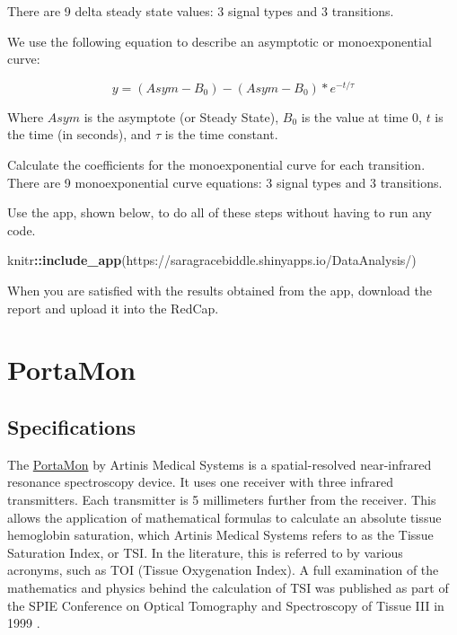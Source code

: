\documentclass[
]{book}
\newenvironment{Shaded}{\begin{snugshade}}{\end{snugshade}}
\newcommand{\FunctionTok}[1]{\textcolor[rgb]{0.13,0.29,0.53}{\textbf{#1}}}
\newcommand{\NormalTok}[1]{#1}
\newcommand{\SpecialCharTok}[1]{\textcolor[rgb]{0.81,0.36,0.00}{\textbf{#1}}}
\newcommand{\StringTok}[1]{\textcolor[rgb]{0.31,0.60,0.02}{#1}}
\begin{document}
There are 9 delta steady state values: 3 signal types and 3 transitions.

We use the following equation to describe an asymptotic or monoexponential curve:

\[y =({Asym}-B_0) - ({Asym}-B_0)*e^{-t/ \tau} \]

Where \({Asym}\) is the asymptote (or Steady State), \(B_0\) is the value at time 0, \(t\) is the time (in seconds), and \(\tau\) is the time constant.

Calculate the coefficients for the monoexponential curve for each transition. There are 9 monoexponential curve equations: 3 signal types and 3 transitions.

Use the app, shown below, to do all of these steps without having to run any code.

\begin{Shaded}
\begin{Highlighting}[]
\NormalTok{knitr}\SpecialCharTok{::}\FunctionTok{include\_app}\NormalTok{(}\StringTok{\textquotesingle{}https://saragracebiddle.shinyapps.io/DataAnalysis/\textquotesingle{}}\NormalTok{)}
\end{Highlighting}
\end{Shaded}

When you are satisfied with the results obtained from the app, download the report and upload it into the RedCap.

\hypertarget{appendix-appendix}{%
\appendix}


\hypertarget{PortaMon}{%
\chapter{PortaMon}\label{PortaMon}}

\hypertarget{PortaMon-Specs}{%
\section{Specifications}\label{PortaMon-Specs}}

The \href{https://www.artinis.com/portamon}{PortaMon} by Artinis Medical Systems is a spatial-resolved near-infrared resonance spectroscopy device. It uses one receiver with three infrared transmitters. Each transmitter is 5 millimeters further from the receiver. This allows the application of mathematical formulas to calculate an absolute tissue hemoglobin saturation, which Artinis Medical Systems refers to as the Tissue Saturation Index, or TSI. In the literature, this is referred to by various acronyms, such as TOI (Tissue Oxygenation Index). A full examination of the mathematics and physics behind the calculation of TSI was published as part of the SPIE Conference on Optical Tomography and Spectroscopy of Tissue III in 1999 \citep{Suzuki1999TissueOM}.
\end{document}
